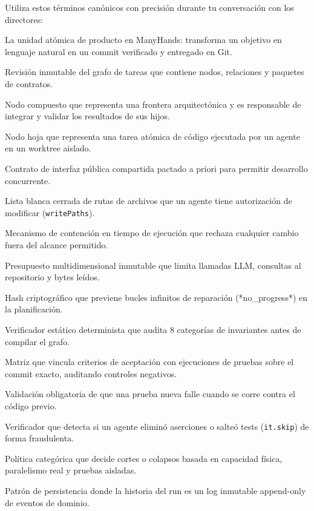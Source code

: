 \documentclass[11pt,a4paper]{article}
\begin{document}
Utiliza estos términos canónicos con precisión durante tu conversación con los directores:

\begin{description}[leftmargin=3.8cm,style=nextline]
  \item[\texttt{Run}] La unidad atómica de producto en ManyHands: transforma un objetivo en lenguaje natural en un commit verificado y entregado en Git.
  \item[\texttt{GraphRevision}] Revisión inmutable del grafo de tareas que contiene nodos, relaciones y paquetes de contratos.
  \item[\texttt{Composite Node}] Nodo compuesto que representa una frontera arquitectónica y es responsable de integrar y validar los resultados de sus hijos.
  \item[\texttt{Leaf Node}] Nodo hoja que representa una tarea atómica de código ejecutada por un agente en un worktree aislado.
  \item[\texttt{SeamContract}] Contrato de interfaz pública compartida pactado a priori para permitir desarrollo concurrente.
  \item[\texttt{ScopeContract}] Lista blanca cerrada de rutas de archivos que un agente tiene autorización de modificar (\texttt{writePaths}).
  \item[\texttt{Scope Guard}] Mecanismo de contención en tiempo de ejecución que rechaza cualquier cambio fuera del alcance permitido.
  \item[\texttt{PlanningBudget}] Presupuesto multidimensional inmutable que limita llamadas LLM, consultas al repositorio y bytes leídos.
  \item[\texttt{CausalDigest}] Hash criptográfico que previene bucles infinitos de reparación (*no\_progress*) en la planificación.
  \item[\texttt{verifyPlan}] Verificador estático determinista que audita 8 categorías de invariantes antes de compilar el grafo.
  \item[\texttt{EvidenceMatrix}] Matriz que vincula criterios de aceptación con ejecuciones de pruebas sobre el commit exacto, auditando controles negativos.
  \item[\texttt{Negative Control}] Validación obligatoria de que una prueba nueva falle cuando se corre contra el código previo.
  \item[\texttt{Test Integrity Guard}] Verificador que detecta si un agente eliminó aserciones o salteó tests (\texttt{it.skip}) de forma fraudulenta.
  \item[\texttt{GranularityPolicy 4.0}] Política categórica que decide cortes o colapsos basada en capacidad física, paralelismo real y pruebas aisladas.
  \item[\texttt{Event Sourcing}] Patrón de persistencia donde la historia del run es un log inmutable append-only de eventos de dominio.
\end{description}
\end{document}
